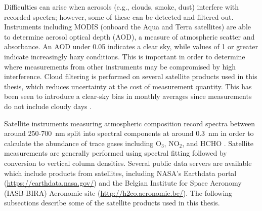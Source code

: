     Difficulties can arise when aerosols (e.g., clouds, smoke, dust) interfere with recorded spectra; however, some of these can be detected and filtered out.
    Instruments including MODIS (onboard the Aqua and Terra satellites) are able to determine aerosol optical depth (AOD), a measure of atmospheric scatter and absorbance. 
    An AOD under 0.05 indicates a clear sky, while values of 1 or greater indicate increasingly hazy conditions.
    This is important in order to determine where measurements from other instruments may be compromised by high interference.
    Cloud filtering is performed on several satellite products used in this thesis, which reduces uncertainty at the cost of measurement quantity. 
    This has been seen to introduce a clear-sky bias in monthly averages since measurements do not include cloudy days \parencite{Surl2018}.
    
    Satellite instruments measuring atmospheric composition record spectra between around 250-700~nm split into spectral components at around $0.3$~nm in order to calculate the abundance of trace gases including O$_3$, NO$_2$, and HCHO \parencite[e.g.,][]{Leue2001}.
    Satellite measurements are generally performed using spectral fitting followed by conversion to vertical column densities.
    Several public data servers are available which include products from satellites, including NASA's Earthdata portal (\url{https://earthdata.nasa.gov/}) and the Belgian Institute for Space Aeronomy (IASB-BIRA) Aeronomie site (\url{http://h2co.aeronomie.be/}).
    The following subsections describe some of the satellite products used in this thesis.
    
    
